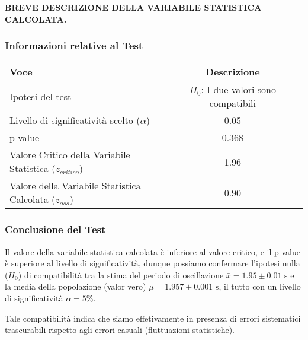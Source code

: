 \documentclass{article}
\begin{document}
\textbf{BREVE DESCRIZIONE DELLA VARIABILE STATISTICA CALCOLATA. }

\subsubsection{Informazioni relative al Test}

\begin{table}[ht]
    \centering
            \begin{tabular}{|l|c|p{10cm}|}
                \hline
                    \textbf{Voce} & \textbf{Descrizione} \\
                \hline
                    Ipotesi del test & \textbf{\(H_0\)}: I due valori sono compatibili \\
                \hline
                    Livello di significatività scelto ($\alpha$) & 0.05 \\
                \hline
                  p-value & 0.368 \\
                \hline 
                    Valore Critico della Variabile Statistica ($z_{critico}$)  &  1.96 \\
                \hline
                    Valore della Variabile Statistica Calcolata ($z_{oss}$) & 0.90 \\
                \hline          
            \end{tabular}
        \label{tab:gauss_test}
\end{table}

\subsubsection{Conclusione del Test}
Il valore della variabile statistica calcolata è inferiore al valore critico, e il p-value è superiore al livello di significatività, dunque possiamo confermare l'ipotesi nulla ($H_0$) di compatibilità tra la stima del periodo di oscillazione $\bar{x} = 1.95 \pm 0.01 \text{ s}$ e la media della popolazione (valor vero) $\mu = 1.957 \pm 0.001 \text{ s}$, il tutto con un livello di significatività $\alpha = 5\%$.

Tale compatibilità indica che siamo effetivamente in presenza di errori sistematici trascurabili rispetto agli errori casuali (fluttuazioni statistiche).
\end{document}
